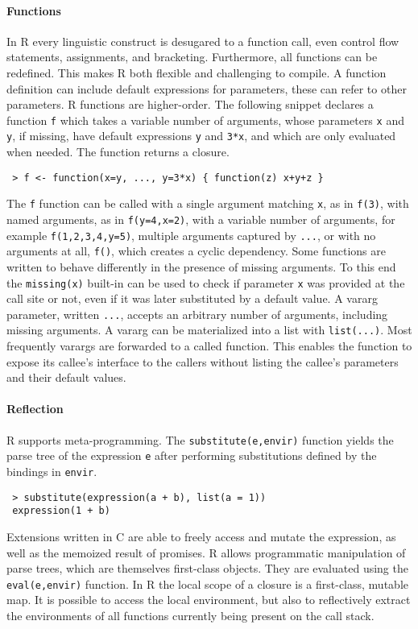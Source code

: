 \documentclass[review,creen,acmsmall]{acmart}
\newcommand{\code}[1]{\lstinline |#1|\xspace}
\renewcommand{\c}[1]{\lstinline |#1|\xspace}
\begin{document}
\paragraph{Functions}
In R every linguistic construct is desugared to a function call, even control
flow statements, assignments, and bracketing. Furthermore, all functions can be
redefined. This makes R both flexible and challenging to compile. A function
definition can include default expressions for parameters, these can refer to
other parameters. R functions are higher-order. The following snippet declares a
function \code f which takes a variable number of arguments, whose parameters
\code x and \code y, if missing, have default expressions \code y and
\code{3*x}, and which are only evaluated when needed. The function returns a closure.
\begin{lstlisting}
 > f <- function(x=y, ..., y=3*x) { function(z) x+y+z }
\end{lstlisting}\vspace{1mm}
\noindent
The \code f function can be called with a single argument matching \code x, as in
\code{f(3)}, with named arguments, as in \code{f(y=4,x=2)}, with a variable
number of arguments, for example \code{f(1,2,3,4,y=5)}, multiple arguments
captured by \code{...}, or with no arguments at all, \code{f()}, which creates a
cyclic dependency. Some functions are written to behave differently in the
presence of missing arguments. To this end the \c{missing(x)} built-in can be
used to check if parameter \code{x} was provided at the call site or not, even
if it was later substituted by a default value. A vararg parameter, written
\code{...}, accepts an arbitrary number of arguments, including missing
arguments. A vararg can be materialized into a list with \code{list(...)}. Most
frequently varargs are forwarded to a called function. This enables the
function to expose its callee's interface to the callers without listing the
callee's parameters and their default values.

\paragraph{Reflection}
R supports meta-programming. The \code{substitute(e,envir)}
function yields the parse tree of the expression \code{e} after performing
substitutions defined by the bindings in \code{envir}.
\vspace{-1mm}
\begin{lstlisting}
 > substitute(expression(a + b), list(a = 1))
 expression(1 + b)
\end{lstlisting}
\noindent
Extensions written in C are able to freely access and mutate the expression, as
well as the memoized result of promises. R allows programmatic manipulation of
parse trees, which are themselves first-class objects. They are evaluated using
the \code{eval(e,envir)} function. In R the local scope of a closure is a
first-class, mutable map. It is possible to access the local environment, but
also to reflectively extract the environments of all functions currently being
present on the call stack.
\end{document}
